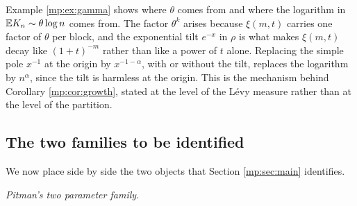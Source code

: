 Example \ref{mp:ex:gamma} shows where $\theta$ comes from and where the logarithm in
$\mathbb{E} K_n\sim\theta\log n$ comes from. The factor $\theta^k$ arises because
$\xi(m,t)$ carries one factor of $\theta$ per block, and the exponential tilt $e^{-x}$
in $\rho$ is what makes $\xi(m,t)$ decay like $(1+t)^{-m}$ rather than like a power of
$t$ alone. Replacing the simple pole $x^{-1}$ at the origin by $x^{-1-\alpha}$, with or without the tilt, replaces the
logarithm by $n^{\alpha}$, since the tilt is harmless at the origin. This is the mechanism behind Corollary \ref{mp:cor:growth}, stated
at the level of the L\'evy measure rather than at the level of the partition.

\subsection{The two families to be identified}

We now place side by side the two objects that Section \ref{mp:sec:main} identifies.

\medskip
\noindent\emph{Pitman's two parameter family.}

